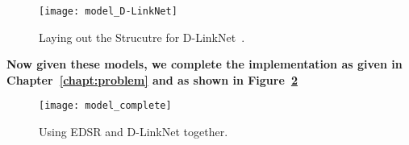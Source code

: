 \begin{figure}[t]
  \centering
  \texttt{[image: model\_D-LinkNet]}
  \caption{Laying out the Strucutre for D-LinkNet~\cite{D-LinkNet}.}
  \label{fig:model_D-LinkNet}
\end{figure}


\textbf{Now given these models, we complete the implementation as given in Chapter~\ref{chapt:problem} and as shown in Figure~\ref{fig:model_complete}}

\begin{figure}[h!]
  \centering
  \texttt{[image: model\_complete]}
  \caption{Using EDSR and D-LinkNet together.}
  \label{fig:model_complete}
\end{figure}